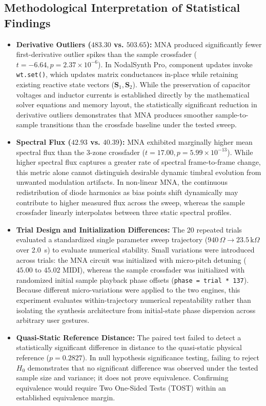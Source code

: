 \documentclass[fleqn,final]{jaes}
\begin{document}
\subsection{Methodological Interpretation of Statistical Findings}
\begin{itemize}
\item \textbf{Derivative Outliers ($483.30$ vs. $503.65$):} MNA produced significantly fewer first-derivative outlier spikes than the sample crossfader ($t = -6.64, p = 2.37 \times 10^{-6}$). In NodalSynth Pro, component updates invoke \texttt{wt.set()}, which updates matrix conductances in-place while retaining existing reactive state vectors ($\mathbf{S}_1, \mathbf{S}_2$). While the preservation of capacitor voltages and inductor currents is established directly by the mathematical solver equations and memory layout, the statistically significant reduction in derivative outliers demonstrates that MNA produces smoother sample-to-sample transitions than the crossfade baseline under the tested sweep.
\item \textbf{Spectral Flux ($42.93$ vs. $40.39$):} MNA exhibited marginally higher mean spectral flux than the 3-zone crossfader ($t = 17.00, p = 5.99 \times 10^{-13}$). While higher spectral flux captures a greater rate of spectral frame-to-frame change, this metric alone cannot distinguish desirable dynamic timbral evolution from unwanted modulation artifacts. In non-linear MNA, the continuous redistribution of diode harmonics as bias points shift dynamically may contribute to higher measured flux across the sweep, whereas the sample crossfader linearly interpolates between three static spectral profiles.
\item \textbf{Trial Design and Initialization Differences:} The 20 repeated trials evaluated a standardized single parameter sweep trajectory ($940\,\Omega \to 23.5\,\text{k}\Omega$ over 2.0~s) to evaluate numerical stability. Small variations were introduced across trials: the MNA circuit was initialized with micro-pitch detuning ($45.00$ to $45.02$ MIDI), whereas the sample crossfader was initialized with randomized initial sample playback phase offsets (\texttt{phase = trial * 137}). Because different micro-variations were applied to the two engines, this experiment evaluates within-trajectory numerical repeatability rather than isolating the synthesis architecture from initial-state phase dispersion across arbitrary user gestures.
\item \textbf{Quasi-Static Reference Distance:} The paired test failed to detect a statistically significant difference in distance to the quasi-static physical reference ($p = 0.2827$). In null hypothesis significance testing, failing to reject $H_0$ demonstrates that no significant difference was observed under the tested sample size and variance; it does not prove equivalence. Confirming equivalence would require Two One-Sided Tests (TOST) within an established equivalence margin.
\end{itemize}
\end{document}
